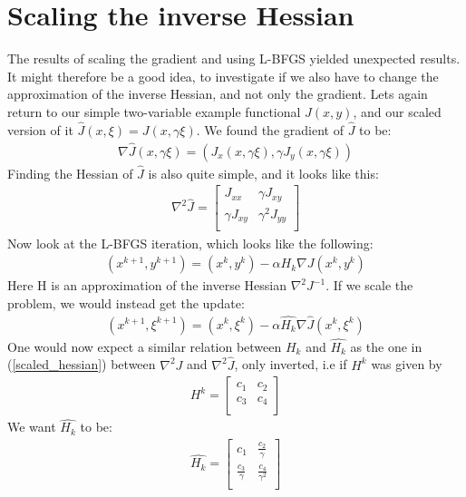\documentclass[11pt,a4paper]{article}
\begin{document}
\section{Scaling the inverse Hessian}
The results of scaling the gradient and using L-BFGS yielded unexpected results. It might therefore be a good idea, to investigate if we also have to change the approximation of the inverse Hessian, and not only the gradient. Lets again return to our simple two-variable example functional $J(x,y)$, and our scaled version of it $\hat{J}(x,\xi)=J(x,\gamma\xi)$. We found the gradient of $\hat{J}$ to be:
\begin{align*}
\nabla \hat{J}(x,\gamma\xi) = (J_x(x,\gamma\xi),\gamma J_y(x,\gamma\xi))
\end{align*}
Finding the Hessian of $\hat{J}$ is also quite simple, and it looks like this:
\begin{align}
  \nabla^2 \hat{J}=\left[ \begin{array}{cc}
   J_{xx} & \gamma J_{xy}\\
    \gamma J_{xy}& \gamma^2J_{yy}\\
   \end{array}  \right]  \label{scaled_hessian}  
\end{align}
Now look at the L-BFGS iteration, which looks like the following:
\begin{align*}
(x^{k+1},y^{k+1}) = (x^k,y^k) - \alpha H_k \nabla J(x^k,y^k)
\end{align*}
Here H is an approximation of the inverse Hessian $ \nabla^2 J^{-1}$. If we scale the problem, we would instead get the update:
\begin{align*}
(x^{k+1},\xi^{k+1}) = (x^k,\xi^k) - \alpha \hat{H_k} \nabla \hat{J}(x^k,\xi^k)
\end{align*}
One would now expect a similar relation between $H_k$ and $\hat{H_k}$ as the one in (\ref{scaled_hessian}) between $\nabla^2 J$ and $\nabla^2 \hat{J}$, only inverted, i.e if $H^k$ was given by
\begin{align*}
	H^k=\left[ \begin{array}{cc}
   	c_1 & c_2\\
    	c_3& c_4\\
   \end{array}  \right]
\end{align*}
We want  $\hat{H_k}$ to be:
\begin{align}
	\hat{H_k}=\left[ \begin{array}{cc}
   	c_1 & \frac{c_2}{\gamma}\\
    	\frac{c_3}{\gamma}& \frac{c_4}{\gamma^2}\\
   \end{array}  \right] \label{Ihessian_property}
\end{align}
\end{document}

